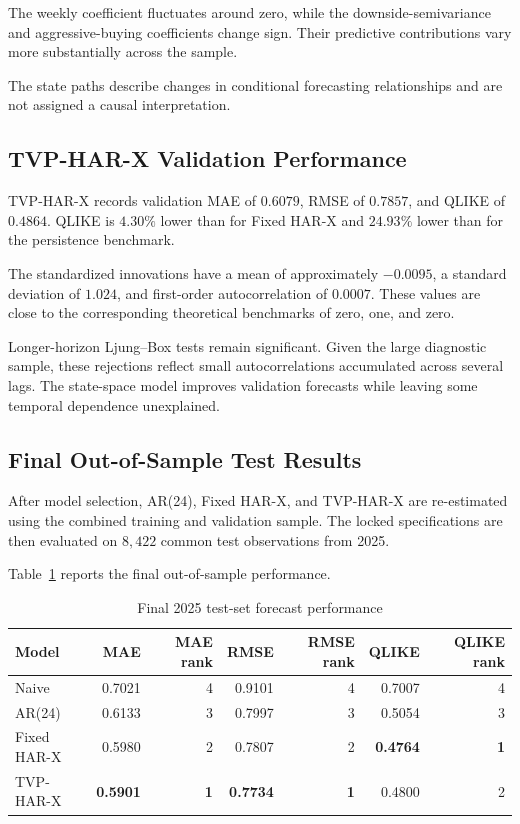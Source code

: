 The weekly coefficient fluctuates around zero, while the
downside-semivariance and aggressive-buying coefficients
change sign. Their predictive contributions vary more
substantially across the sample.

The state paths describe changes in conditional forecasting
relationships and are not assigned a causal interpretation.

\subsection{TVP-HAR-X Validation Performance}

TVP-HAR-X records validation MAE of \(0.6079\), RMSE of
\(0.7857\), and QLIKE of \(0.4864\). QLIKE is \(4.30\%\)
lower than for Fixed HAR-X and \(24.93\%\) lower than for the
persistence benchmark.

The standardized innovations have a mean of approximately
\(-0.0095\), a standard deviation of \(1.024\), and
first-order autocorrelation of \(0.0007\). These values are
close to the corresponding theoretical benchmarks of zero,
one, and zero.

Longer-horizon Ljung--Box tests remain significant. Given the
large diagnostic sample, these rejections reflect small
autocorrelations accumulated across several lags. The
state-space model improves validation forecasts while leaving
some temporal dependence unexplained.

\subsection{Final Out-of-Sample Test Results}

After model selection, AR(24), Fixed HAR-X, and TVP-HAR-X
are re-estimated using the combined training and validation
sample. The locked specifications are then evaluated on
\(8{,}422\) common test observations from 2025.

Table~\ref{tab:final-test-results} reports the final
out-of-sample performance.

\begin{table}[H]
\centering
\caption{Final 2025 test-set forecast performance}
\label{tab:final-test-results}
\begin{tabular}{lrrrrrr}
\toprule
Model
& MAE
& MAE rank
& RMSE
& RMSE rank
& QLIKE
& QLIKE rank \\
\midrule
Naive
& 0.7021
& 4
& 0.9101
& 4
& 0.7007
& 4 \\

AR(24)
& 0.6133
& 3
& 0.7997
& 3
& 0.5054
& 3 \\

Fixed HAR-X
& 0.5980
& 2
& 0.7807
& 2
& \textbf{0.4764}
& \textbf{1} \\

TVP-HAR-X
& \textbf{0.5901}
& \textbf{1}
& \textbf{0.7734}
& \textbf{1}
& 0.4800
& 2 \\
\bottomrule
\end{tabular}
\end{table}

